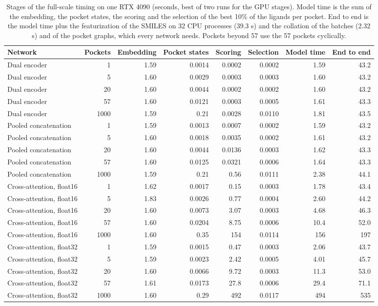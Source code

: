 \begin{table}[h]
\caption{Stages of the full-scale timing on one RTX 4090 (seconds, best of two runs for the GPU stages). Model time is the sum of the embedding, the pocket states, the scoring and the selection of the best 10\% of the ligands per pocket. End to end is the model time plus the featurization of the SMILES on 32 CPU processes (39.3 s) and the collation of the batches (2.32 s) and of the pocket graphs, which every network needs. Pockets beyond 57 use the 57 pockets cyclically.}
\label{tab:si_timing}
\footnotesize
\setlength{\tabcolsep}{3pt}
\begin{tabular}{lrrrrrrr}
\toprule
Network & Pockets & Embedding & Pocket states & Scoring & Selection & Model time & End to end \\
\midrule
Dual encoder & 1 & 1.59 & 0.0014 & 0.0002 & 0.0002 & 1.59 & 43.2 \\
Dual encoder & 5 & 1.60 & 0.0029 & 0.0003 & 0.0003 & 1.60 & 43.2 \\
Dual encoder & 20 & 1.60 & 0.0044 & 0.0002 & 0.0002 & 1.60 & 43.2 \\
Dual encoder & 57 & 1.60 & 0.0121 & 0.0003 & 0.0005 & 1.61 & 43.3 \\
Dual encoder & 1000 & 1.59 & 0.21 & 0.0028 & 0.0110 & 1.81 & 43.5 \\
\midrule
Pooled concatenation & 1 & 1.59 & 0.0013 & 0.0007 & 0.0002 & 1.59 & 43.2 \\
Pooled concatenation & 5 & 1.60 & 0.0018 & 0.0035 & 0.0002 & 1.61 & 43.2 \\
Pooled concatenation & 20 & 1.60 & 0.0044 & 0.0136 & 0.0003 & 1.62 & 43.3 \\
Pooled concatenation & 57 & 1.60 & 0.0125 & 0.0321 & 0.0006 & 1.64 & 43.3 \\
Pooled concatenation & 1000 & 1.59 & 0.21 & 0.56 & 0.0111 & 2.38 & 44.1 \\
\midrule
Cross-attention, float16 & 1 & 1.62 & 0.0017 & 0.15 & 0.0003 & 1.78 & 43.4 \\
Cross-attention, float16 & 5 & 1.83 & 0.0026 & 0.77 & 0.0004 & 2.60 & 44.2 \\
Cross-attention, float16 & 20 & 1.60 & 0.0073 & 3.07 & 0.0003 & 4.68 & 46.3 \\
Cross-attention, float16 & 57 & 1.60 & 0.0204 & 8.75 & 0.0006 & 10.4 & 52.0 \\
Cross-attention, float16 & 1000 & 1.60 & 0.35 & 154 & 0.0114 & 156 & 197 \\
\midrule
Cross-attention, float32 & 1 & 1.59 & 0.0015 & 0.47 & 0.0003 & 2.06 & 43.7 \\
Cross-attention, float32 & 5 & 1.59 & 0.0023 & 2.42 & 0.0005 & 4.01 & 45.7 \\
Cross-attention, float32 & 20 & 1.60 & 0.0066 & 9.72 & 0.0003 & 11.3 & 53.0 \\
Cross-attention, float32 & 57 & 1.61 & 0.0173 & 27.8 & 0.0006 & 29.4 & 71.1 \\
Cross-attention, float32 & 1000 & 1.60 & 0.29 & 492 & 0.0117 & 494 & 535 \\
\bottomrule
\end{tabular}
\end{table}
